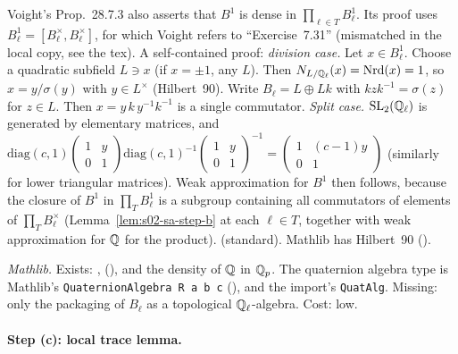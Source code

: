 \begin{remark}\label{rem:s02-sa-weakB1}
Voight's Prop.~28.7.3 also asserts that $B^1$ is dense in $\prod_{\ell\in T}B^1_\ell$. Its proof uses
$B^1_\ell=[B^\times_\ell,B^\times_\ell]$, for which Voight refers to ``Exercise~7.31'' (mismatched in the local copy, see the tex). A
self-contained proof: \emph{division case.} Let $x\in B_\ell^1$. Choose a quadratic subfield $L\ni x$ (if $x=\pm1$, any
$L$). Then $N_{L/\mathbb{Q}_\ell}(x)=\mathrm{Nrd}(x)=1$, so $x=y/\sigma(y)$ with $y\in L^\times$ (Hilbert~90). Write $B_\ell=L\oplus Lk$ with
$kzk^{-1}=\sigma(z)$ for $z\in L$. Then $x=y\,k\,y^{-1}k^{-1}$ is a single commutator. \emph{Split case.}
$\mathrm{SL}_2(\mathbb{Q}_\ell)$ is generated by elementary matrices, and
$\mathrm{diag}(c,1)\left(\begin{smallmatrix}1&y\\0&1\end{smallmatrix}\right)\mathrm{diag}(c,1)^{-1}
\left(\begin{smallmatrix}1&y\\0&1\end{smallmatrix}\right)^{-1}=\left(\begin{smallmatrix}1&(c-1)y\\0&1\end{smallmatrix}\right)$
(similarly for lower triangular matrices). Weak approximation for $B^1$ then follows, because the closure of $B^1$ in
$\prod_TB^1_\ell$ is a subgroup containing all commutators of elements of $\prod_TB^\times_\ell$ (Lemma~\ref{lem:s02-sa-step-b} at
each $\ell\in T$, together with weak approximation for $\mathbb{Q}$ for the product). \stproved{} (standard). Mathlib has Hilbert~90
().
\end{remark}

\noindent\emph{Mathlib.} Exists: ,  (), and the
density of $\mathbb{Q}$ in $\mathbb{Q}_p$. The quaternion algebra type is Mathlib's \texttt{QuaternionAlgebra R a b c}
(), and the import's \texttt{QuatAlg}. Missing: only the packaging of $B_\ell$ as a topological
$\mathbb{Q}_\ell$-algebra. Cost: low.

\paragraph{Step (c): local trace lemma.}

